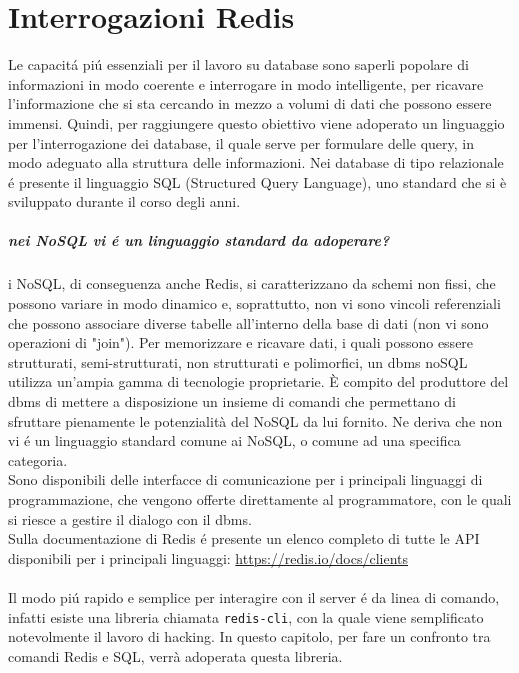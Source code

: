 \chapter{Interrogazioni Redis}
Le capacitá piú essenziali per il lavoro su database sono saperli popolare di informazioni in modo coerente e interrogare in modo
intelligente, per ricavare l'informazione che si sta cercando in mezzo a volumi di dati che possono essere immensi.
Quindi, per raggiungere questo obiettivo viene adoperato un linguaggio per l'interrogazione dei database, il quale serve per formulare delle
query, in modo adeguato alla struttura delle informazioni.
Nei database di tipo relazionale é presente il linguaggio SQL (Structured Query Language), uno standard che si è sviluppato
durante il corso degli anni.

\paragraph{nei NoSQL vi é un linguaggio standard da adoperare?\\}
i NoSQL, di conseguenza anche Redis, si caratterizzano da schemi non fissi, che possono variare in modo dinamico e, soprattutto, non vi sono vincoli referenziali che possono associare
diverse tabelle all'interno della base di dati (non vi sono operazioni di "join").
Per memorizzare e ricavare dati, i quali possono essere strutturati, semi-strutturati, non strutturati e polimorfici, un dbms noSQL utilizza un'ampia gamma di
tecnologie proprietarie.
È compito del produttore del dbms di mettere a disposizione un insieme di comandi che permettano di sfruttare pienamente le potenzialità del NoSQL da lui fornito.
Ne deriva che non vi é un linguaggio standard comune ai NoSQL, o comune ad una specifica categoria.\\
Sono disponibili delle interfacce di comunicazione per i principali linguaggi di programmazione, che vengono
offerte direttamente al programmatore, con le quali si riesce a gestire il dialogo con il dbms.
\\
Sulla documentazione di Redis é presente un elenco completo di tutte le API disponibili per i principali linguaggi:
\url{https://redis.io/docs/clients}\\
\\
Il modo piú rapido e semplice per interagire con il server é da linea di comando, infatti esiste una libreria chiamata
\texttt{redis-cli}, con la quale viene semplificato notevolmente il lavoro di hacking.
In questo capitolo, per fare un confronto tra comandi Redis e SQL, verrà adoperata questa libreria.\\
